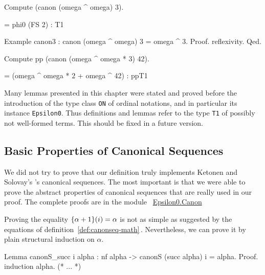 \begin{Coqsrc}
Compute (canon (omega ^ omega) 3).
\end{Coqsrc}

\begin{Coqanswer}
  = phi0 (FS 2) : T1
\end{Coqanswer}

\begin{Coqsrc}
Example canon3 :  canon (omega ^ omega) 3 = omega ^ 3.
Proof. reflexivity. Qed.
\end{Coqsrc}


\begin{Coqsrc}
Compute pp (canon (omega ^ omega * 3) 42).  
\end{Coqsrc}

\begin{Coqanswer}
    = (omega ^ omega * 2 + omega ^ 42)%
     : ppT1
\end{Coqanswer}

\begin{project}
Many lemmas presented in this chapter were stated and proved before the introduction of 
the type class \texttt{ON} of ordinal notations, and in particular its  instance \texttt{Epsilon0}.
Thus definitions and lemmas refer to the type \texttt{T1} of possibly not well-formed terms.
This should be fixed in  a future version.
\end{project}


\subsection{Basic Properties of Canonical Sequences}

We did not  try to prove that our definition truly implements Ketonen and Solovay's  \cite{KS81}'s canonical sequences. The most important is that we were able to prove the 
abstract properties  of canonical sequences that are really used in our proof. The complete proofs are in the module
~\href{../theories/html/hydras.Epsilon0.Canon.html}{Epsilon0.Canon}


Proving the equality $\mbox{$\{\alpha+1\}(i)$}=\alpha$ is not 
as simple as suggested by the equations of definition~\ref{def:canonseq-math}\,.
Nevertheless, we can prove it by  plain structural induction on $\alpha$.

\begin{Coqsrc}
Lemma canonS_succ i alpha :
  nf alpha ->  canonS (succ alpha) i = alpha.
Proof.
 induction alpha.
 (* ... *)
\end{Coqsrc}

